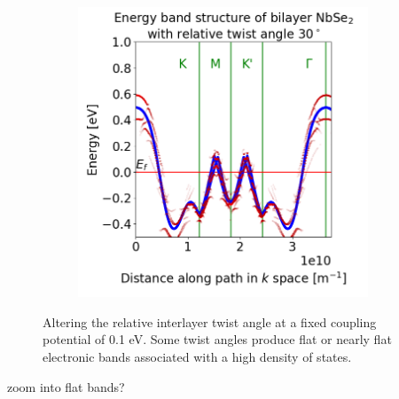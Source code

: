 \documentclass[12pt]{report} %
\begin{document}
\begin{figure}[t]
\begin{subfigure}[b]{0.475\textwidth}
    \caption{}
    \label{bilayer_rotation_20}
  \end{subfigure}
  \hfill
  \begin{subfigure}[b]{0.475\textwidth}
    \centering
    \includegraphics[width=0.95\textwidth]{30_deg_0.1_coupling.png}
    \caption{}
    \label{bilayer_rotation_30}
  \end{subfigure}
  \caption{
    Altering the relative interlayer twist angle at a fixed coupling potential of 0.1 eV. Some twist angles produce flat or nearly flat electronic bands associated with a high density of states.
  }
  \label{bilayer_bands_projected_rotation}
\end{figure}

zoom into flat bands?
\end{document}
